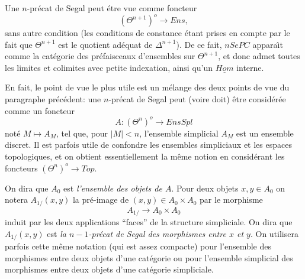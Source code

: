 \documentclass[12pt]{article}
\begin{document}
Une $n$-pr\'ecat
de Segal peut \'etre vue comme foncteur
$$
(\Theta ^{n+1})^o\rightarrow Ens,
$$
sans autre condition (les conditions de constance \'etant prises en compte par
le fait que $\Theta ^{n+1}$ est le quotient ad\'equat de $\Delta ^{n+1}$).
De ce fait, $nSePC$ appara\^{\i}t comme la cat\'egorie des pr\'efaisceaux
d'ensembles sur
$\Theta ^{n+1}$, et donc admet toutes
les limites et colimites avec petite indexation,
ainsi qu'un $\underline{Hom}$  interne.

En fait, le point de vue le plus utile est un m\'elange des deux points de
vue du
paragraphe pr\'ec\'edent: une $n$-pr\'ecat de Segal peut (voire doit) \^etre
consid\'er\'ee comme un foncteur
$$
A: (\Theta ^n)^o\rightarrow EnsSpl
$$
not\'e $M\mapsto A_M$, tel que, pour $|M| < n$, l'ensemble simplicial $A_M$
est un ensemble discret. Il est parfois utile de confondre les ensembles
simpliciaux et les espaces topologiques, et on obtient essentiellement la
m\^eme notion en consid\'erant les foncteurs $(\Theta ^n)^o\rightarrow Top$.

On dira que  $A_0$ est {\em l'ensemble des objets de $A$}. Pour deux objets
$x,y\in A_0$
on notera $A_{1/}(x,y)$ la pr\'e-image de $(x,y)\in A_0\times A_0$ par le
morphisme
$$
A_{1/}\rightarrow A_0\times A_0
$$
induit par les deux applications ``faces'' de la structure simpliciale.
On dira que $A_{1/}(x,y)$ est {\em la $n-1$-pr\'ecat de Segal des
morphismes entre $x$
et $y$}. On utilisera parfois cette m\^eme notation (qui est assez compacte)
pour l'ensemble des morphismes entre deux objets d'une cat\'egorie ou pour
l'ensemble
simplicial des morphismes entre deux objets d'une cat\'egorie simpliciale.
\end{document}
